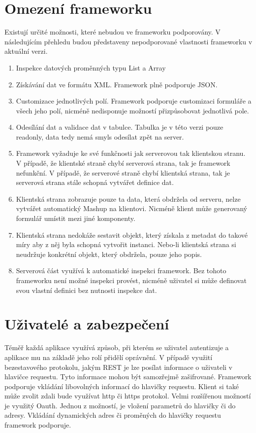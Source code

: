 \section{Omezení frameworku}
Existují určité možnosti, které nebudou ve frameworku podporovány. V následujícím přehledu budou představeny nepodporované vlastnosti frameworku v aktuální verzi.
\begin{enumerate}
\item Inspekce datových proměnných typu List a Array
\item Získávání dat ve formátu XML. Framework plně podporuje JSON.
\item Customizace jednotlivých polí. Framework podporuje customizaci formuláře a všech jeho polí, nicméně nedisponuje možností přizpůsobovat jednotlivá pole.
\item Odesílání dat a validace dat v tabulce. Tabulka je v této verzi pouze readonly, data tedy nemá smyls odesílat zpět na server.
\item Framework vyžaduje ke své funkčnosti jak serverovou tak klientskou stranu. V případě, že klientské straně chybí serverová strana, tak je framework nefunkční. V případě, že serverové straně chybí klientská strana, tak je serverová strana stále schopná vytvářet definice dat.
\item Klientská strana zobrazuje pouze ta data, která obdržela od serveru, nelze vytvářet automatický Mashup na klientovi. Nicméně klient může generovaný formulář umístit mezi jiné komponenty.
\item Klientská strana nedokáže sestavit objekt, který získala z metadat do takové míry aby z něj byla schopná vytvořit instanci. Nebo-li klientská strana si neudržuje konkrétní objekt, který obdržela, pouze jeho popis.
\item Serverová část využívá k automatické inspekci framework. Bez tohoto frameworku není možné inspekci provést, nicméně uživatel si může definovat svou vlastní definici bez nutnosti inspekce dat.
\end{enumerate}

\section{Uživatelé a zabezpečení}
Téměř každá aplikace využívá způsob, při kterém se uživatel autentizuje a aplikace mu na základě jeho rolí přidělí oprávnění. V případě využití bezestavového protokolu, jakým REST je lze posílat informace o uživateli v hlavičce requestu. Tyto informace mohou být samozřejmě zašifrované. Framework podporuje vkládání libovolných informací do hlavičky requestu. Klient si také může zvolit zdali bude využívat http či https protokol. Velmi rozšířenou možností je využitý Oauth. Jednou z možností, je vložení parametrů do hlavičky či do adresy. Vkládání dynamických adres či proměných do hlavičky requestu framework podporuje. 

